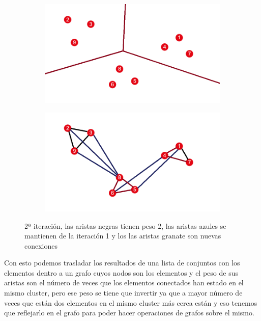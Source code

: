 \documentclass[12pt,a4paper]{article}
\begin{document}
\begin{figure}[H]
\centering
\begin{subfigure}{.5\textwidth}
  \centering
  \includegraphics[width=.9\linewidth]{cluster 2}
  \label{fig:sub1}
\end{subfigure}%
\begin{subfigure}{.5\textwidth}
  \centering
  \includegraphics[width=.9\linewidth]{grafo cluster 2}
  \label{fig:sub2}
\end{subfigure}
\caption{2ª iteración, las aristas negras tienen peso 2, las aristas azules se mantienen de la iteración 1 y los las aristas granate son nuevas conexiones}
\label{fig:test}
\end{figure}
			 Con esto podemos trasladar los resultados de una lista de conjuntos con los elementos dentro a un grafo cuyos nodos son los elementos y el peso de sus aristas son el número de veces que los elementos conectados han estado en el mismo cluster, pero ese peso se tiene que invertir ya que a mayor número de veces que están dos elementos en el mismo cluster más cerca están y eso tenemos que reflejarlo en el grafo para poder hacer operaciones de grafos sobre el mismo.\\
\end{document}
